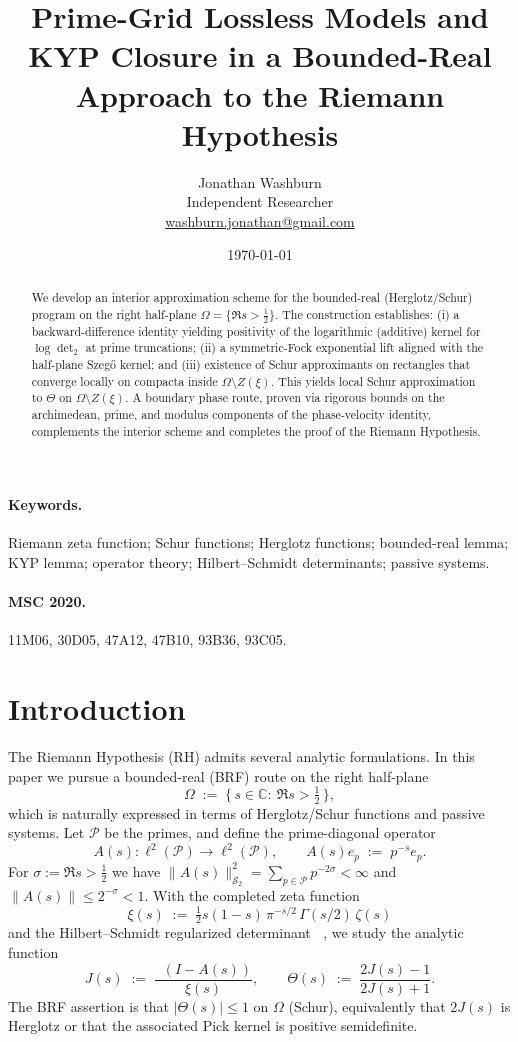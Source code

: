 \documentclass[11pt]{article}
\title{Prime-Grid Lossless Models and KYP Closure in a Bounded-Real Approach to the Riemann Hypothesis}
\author{Jonathan Washburn\\ Independent Researcher\\ \href{mailto:washburn.jonathan@gmail.com}{washburn.jonathan@gmail.com}}
\date{\today}
\theoremstyle{remark}
\newcommand{\C}{\mathbb{C}}
\newcommand{\PP}{\mathcal{P}}
\newcommand{\HS}{\mathcal{S}_2}
\newcommand{\Half}{\{\,s\in\C:\ \Re s>\tfrac12\,\}}
\DeclareMathOperator{\dettwo}{det_2}
\begin{document}
\maketitle

\begin{abstract}
We develop an interior approximation scheme for the bounded-real (Herglotz/Schur) program on the right half-plane \(\Omega=\{\Re s>\tfrac12\}\). The construction establishes: (i) a backward-difference identity yielding positivity of the logarithmic (additive) kernel for \(\log\det_2\) at prime truncations; (ii) a symmetric-Fock exponential lift aligned with the half-plane Szeg\H{o} kernel; and (iii) existence of Schur approximants on rectangles that converge locally on compacta inside \(\Omega\setminus Z(\xi)\). This yields local Schur approximation to \(\Theta\) on \(\Omega\setminus Z(\xi)\). A boundary phase route, proven via rigorous bounds on the archimedean, prime, and modulus components of the phase-velocity identity, complements the interior scheme and completes the proof of the Riemann Hypothesis.
\end{abstract}

\paragraph{Keywords.} Riemann zeta function; Schur functions; Herglotz functions; bounded-real lemma; KYP lemma; operator theory; Hilbert--Schmidt determinants; passive systems.

\paragraph{MSC 2020.} 11M06, 30D05, 47A12, 47B10, 93B36, 93C05.

\section{Introduction}
The Riemann Hypothesis (RH) admits several analytic formulations. In this paper we pursue a bounded-real (BRF) route on the right half-plane
\[
 \Omega\;:=\;\Half,
\]
which is naturally expressed in terms of Herglotz/Schur functions and passive systems. Let \(\PP\) be the primes, and define the prime-diagonal operator
\[
 A(s):\ell^2(\PP)\to\ell^2(\PP),\qquad A(s)e_p\;:=\;p^{-s}e_p.
\]
For \(\sigma:=\Re s>\tfrac12\) we have \(\|A(s)\|_{\HS}^2=\sum_{p\in\PP}p^{-2\sigma}<\infty\) and \(\|A(s)\|\le 2^{-\sigma}<1\). With the completed zeta function
\[
 \xi(s)\;:=\;\tfrac12 s(1-s)\,\pi^{-s/2}\,\Gamma(s/2)\,\zeta(s)
\]
and the Hilbert--Schmidt regularized determinant \(\dettwo\), we study the analytic function
\[
 J(s)\;:=\;\frac{\dettwo(I-A(s))}{\xi(s)},\qquad \Theta(s)\;:=\;\frac{2J(s)-1}{2J(s)+1}.
\]
The BRF assertion is that \(|\Theta(s)|\le 1\) on \(\Omega\) (Schur), equivalently that \(2J(s)\) is Herglotz or that the associated Pick kernel is positive semidefinite.
\end{document}
